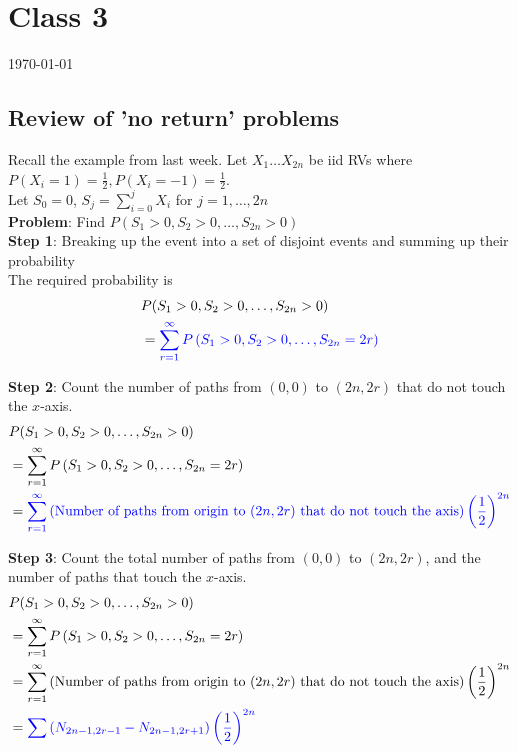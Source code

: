 \chapter{Class 3}

\today \\

\section{Review of 'no return' problems}

Recall the example from last week. Let $X_1 \hdots X_{2n}$ be iid RVs where $P(X_i = 1) = \frac{1}{2}, P(X_i = -1) = \frac{1}{2}$. \\

Let $S_0 = 0$, $S_j = \sum_{i = 0}^{j}X_i$ for $j = 1, \hdots, 2n$  \\

\textbf{Problem}: Find $P(S_1 > 0, S_2 > 0, \hdots, S_{2n} > 0)$  \\

\textbf{Step 1}: Breaking up the event into a set of disjoint events and summing up their probability \\

The required probability is
\begin{align*}
  &P(S_1 > 0, S_2 > 0, \hdots, S_{2n} > 0) \\
  &=\textcolor{blue}{ \sum_{r = 1}^{\infty} P \left( S_1 > 0, S_2 > 0, \hdots, S_{2n} = 2r \right) }
\end{align*}

\textbf{Step 2}: Count the number of paths from $(0, 0)$ to $(2n, 2r)$ that do not touch the $x$-axis.
\begin{align*}
  &P(S_1 > 0, S_2 > 0, \hdots, S_{2n} > 0) \\
  &= \sum_{r = 1}^{\infty} P \left( S_1 > 0, S_2 > 0, \hdots, S_{2n} = 2r \right) \\
  &= \textcolor{blue}{\sum_{r = 1}^{\infty} \left( \text{Number of paths from origin to $(2n, 2r)$ that do not touch the axis} \right)  \left( \frac{1}{2} \right)^{2n}}
\end{align*}

\textbf{Step 3}: Count the total number of paths from $(0, 0)$ to $(2n, 2r)$, and the number of paths that touch the $x$-axis. 
\begin{align*}
  &P(S_1 > 0, S_2 > 0, \hdots, S_{2n} > 0) \\
  &= \sum_{r = 1}^{\infty} P \left( S_1 > 0, S_2 > 0, \hdots, S_{2n} = 2r \right) \\
  &= \sum_{r = 1}^{\infty} \left( \text{Number of paths from origin to $(2n, 2r)$ that do not touch the axis} \right)  \left( \frac{1}{2} \right)^{2n} \\
  &= \textcolor{blue}{\sum \left( N_{2n-1, 2r-1} - N_{2n -1, 2r + 1} \right)  \left( \frac{1}{2} \right)^{2n}}
\end{align*}

